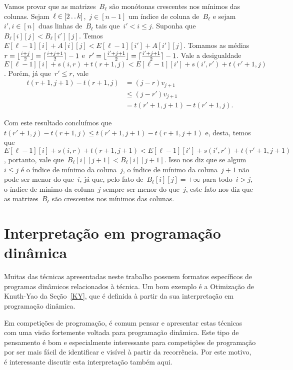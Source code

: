 Vamos provar que as matrizes~$B_\ell$ são monótonas crescentes nos mínimos das colunas. Sejam~${ \ell \in [2 \,.\,.\, k] }$,~${ j \in [n-1] }$ um índice de coluna de~${ B_\ell }$ e sejam~${ i',i \in [n] }$ duas linhas de~$B_\ell$ tais que~${ i' < i \leq j }$. Suponha que~${ B_\ell[i][j] < B_\ell[i'][j] }$. Temos~${ E[\ell-1][i] + A[i][j] < E[\ell-1][i'] + A[i'][j] }$. Tomamos as médias~${ r = \lfloor\frac{i+j}{2}\rfloor = \lceil\frac{i+j+1}{2}\rceil - 1 }$ e~${ r' = \lfloor\frac{i'+j+1}{2}\rfloor = \lceil\frac{i'+j+1}{2}\rceil - 1 }$. Vale a desigualdade~${ E[\ell-1][i] + s(i,r) + t(r+1,j) < E[\ell-1][i'] + s(i',r') + t(r'+1,j) }$. Porém, já que~${ r' \leq r }$, vale
\begin{equation*}
\begin{array}{rl}
t(r+1,j+1) - t(r+1,j) & = (j-r)v_{j+1} \\
& \leq (j-r')v_{j+1} \\
& = t(r'+1,j+1) - t(r'+1,j) \text{.}
\end{array}
\end{equation*}
 
Com este resultado concluímos que~${ t(r'+1,j) - t(r+1,j) \leq t(r'+1,j+1) - t(r+1,j+1) }$ e, desta, temos que~${ E[\ell-1][i] + s(i,r) + t(r+1,j+1) < E[\ell-1][i'] + s(i',r') + t(r'+1,j+1) }$, portanto, vale que~${ B_\ell[i][j+1] < B_\ell[i][j+1] }$. Isso nos diz que se algum~${ i \leq j }$ é o índice de mínimo da coluna~$j$, o índice de mínimo da coluna~${j+1}$ não pode ser menor do que~$i$, já que, pelo fato de~${ B_\ell[i][j] = +\infty }$ para todo~${ i > j }$, o índice de mínimo da coluna~$j$ sempre ser menor do que~$j$, este fato nos diz que as matrizes~$B_\ell$ são crescentes nos mínimos das colunas.


\section{Interpretação em programação dinâmica} \label{DivConq:Inter_DP}

Muitas das técnicas apresentadas neste trabalho possuem formatos específicos de programas dinâmicos relacionados à técnica. Um bom exemplo é a Otimização de Knuth-Yao da Seção~\ref{KY}, que é definida à partir da sua interpretação em programação dinâmica. 

Em competições de programação, é comum pensar e apresentar estas técnicas com uma visão fortemente voltada para programação dinâmica. Este tipo de pensamento é bom e especialmente interessante para competições de programação por ser mais fácil de identificar e visível à partir da recorrência. Por este motivo, é interessante discutir esta interpretação também aqui.

